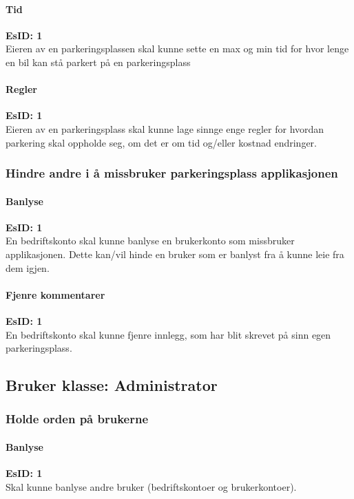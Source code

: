 \documentclass[12pt]{article}
\newcommand{\EsID}[1]{\textbf{EsID: #1}\\}
\begin{document}
            \paragraph{Tid}
            \EsID{1}Eieren av en parkeringsplassen skal kunne sette en max og min tid for hvor lenge en bil kan stå parkert på en parkeringsplass

            \paragraph{Regler}
            \EsID{1}Eieren av en parkeringsplass skal kunne lage sinnge enge regler for hvordan parkering skal oppholde seg, om det er om tid og/eller kostnad endringer.
        
        \subsubsection{Hindre andre i å missbruker parkeringsplass applikasjonen}

            \paragraph{Banlyse}
            \EsID{1}En bedriftskonto skal kunne banlyse en brukerkonto som missbruker applikasjonen. Dette kan/vil hinde en bruker som er banlyst fra å kunne leie fra dem igjen.

            \paragraph{Fjenre kommentarer}
            \EsID{1}En bedriftskonto skal kunne fjenre innlegg, som har blit skrevet på sinn egen parkeringsplass.

    \subsection{Bruker klasse: Administrator}

        \subsubsection{Holde orden på brukerne}

            \paragraph{Banlyse}
            \EsID{1}Skal kunne banlyse andre bruker (bedriftskontoer og brukerkontoer).
\end{document}
